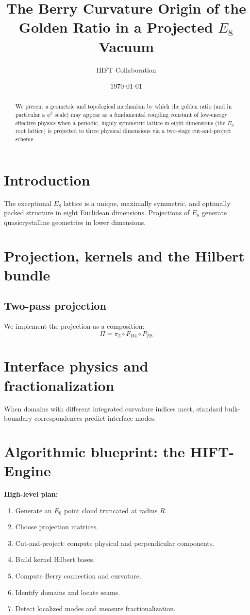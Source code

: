 \documentclass[11pt]{article}
\title{The Berry Curvature Origin of the Golden Ratio in a Projected $E_8$ Vacuum}
\author{HIFT Collaboration}
\date{\today}
\begin{document}
\maketitle

\begin{abstract}
We present a geometric and topological mechanism by which the golden ratio (and in particular a $\phi^2$ scale) may appear as a fundamental coupling constant of low-energy effective physics when a periodic, highly symmetric lattice in eight dimensions (the $E_8$ root lattice) is projected to three physical dimensions via a two-stage cut-and-project scheme.
\end{abstract}

\section{Introduction}
The exceptional $E_8$ lattice is a unique, maximally symmetric, and optimally packed structure in eight Euclidean dimensions. Projections of $E_8$ generate quasicrystalline geometries in lower dimensions.

\section{Projection, kernels and the Hilbert bundle}
\subsection{Two-pass projection}
We implement the projection as a composition:
\begin{equation}
\Pi = \pi_3 \circ F_{H4} \circ P_{E8}
\end{equation}

\section{Interface physics and fractionalization}
When domains with different integrated curvature indices meet, standard bulk-boundary correspondences predict interface modes.

\section{Algorithmic blueprint: the HIFT-Engine}
\textbf{High-level plan:}
\begin{enumerate}
\item Generate an $E_8$ point cloud truncated at radius $R$.
\item Choose projection matrices.
\item Cut-and-project: compute physical and perpendicular components.
\item Build kernel Hilbert bases.
\item Compute Berry connection and curvature.
\item Identify domains and locate seams.
\item Detect localized modes and measure fractionalization.
\end{enumerate}
\end{document}

